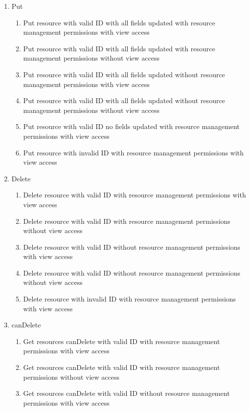 \documentclass[12pt]{article}
\begin{document}
\begin{enumerate}
\begin{enumerate}
\begin{enumerate}
        \end{enumerate}
        \item Put
        \begin{enumerate}
            \item Put resource with valid ID with all fields updated with resource management permissions with view access
            \item Put resource with valid ID with all fields updated with resource management permissions without view access
            \item Put resource with valid ID with all fields updated without resource management permissions with view access
            \item Put resource with valid ID with all fields updated without resource management permissions without view access
            \item Put resource with valid ID no fields updated with resource management permissions with view access
            \item Put resource with invalid ID with resource management permissions with view access
        \end{enumerate}
        \item Delete
        \begin{enumerate}
            \item Delete resource with valid ID with resource management permissions with view access
            \item Delete resource with valid ID with resource management permissions without view access
            \item Delete resource with valid ID without resource management permissions with view access
            \item Delete resource with valid ID without resource management permissions without view access
            \item Delete resource with invalid ID with resource management permissions with view access
        \end{enumerate}
        \item canDelete
            \begin{enumerate}
            \item Get resources canDelete with valid ID with resource management permissions with view access
            \item Get resources canDelete with valid ID with resource management permissions without view access
            \item Get resources canDelete with valid ID without resource management permissions with view access

\end{enumerate}
\end{enumerate}
\end{enumerate}
\end{document}
